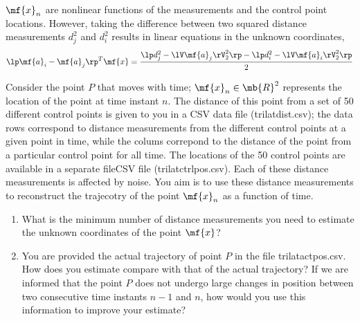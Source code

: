 \begin{enumerate}[resume]
\begin{center}
    \end{center}

    $\mf{x}_n$ are nonlinear functions of the measurements and the control point locations. However, taking the difference between two squared distance measurements $d_j^2$ and $d_i^2$ results in linear equations in the unknown coordinates,
    \[ \lp \mf{a}_i - \mf{a}_j\rp^T\mf{x} = \frac{\lp d_j^2 - \lV\mf{a}_j\rV_2^2 \rp - \lp d_i^2  - \lV\mf{a}_i\rV_2^2 \rp}{2} \]

    Consider the point $P$ that moves with time; $\mf{x}_n \in \mb{R}^{2}$ represents the location of the point at time instant $n$. The distance of this point from a set of 50 different control points is given to you in a CSV data file (trilatdist.csv); the data rows correspond to distance measurements from the different control points at a given point in time, while the colums correpond to the distance of the point from a particular control point for all time. The locations of the 50 control points are available in a separate fileCSV file (trilatctrlpos.csv). Each of these distance measurements is affected by noise. You aim is to use these distance measurements to reconstruct the trajecotry of the point $\mf{x}_n$ as a function of time.
    \begin{enumerate}
        \item What is the minimum number of distance measurements you need to estimate the unknown coordinates of the point $\mf{x}$?
        \item You are provided the actual trajectory of point $P$ in the file trilatactpos.csv. How does you estimate compare with that of the actual trajectory? If we are informed that the point $P$ does not undergo large changes in position between two consecutive time instants $n-1$ and $n$, how would you use this information to improve your estimate?
    \end{enumerate}
\end{enumerate}
